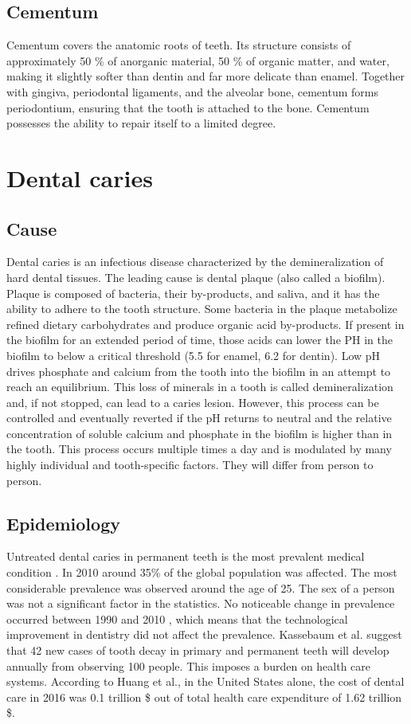 \subsection*{Cementum}
Cementum covers the anatomic roots of teeth. Its structure consists of approximately 50 \% of anorganic material, 50 \% of organic matter, and water, making it slightly softer than dentin and far more delicate than enamel. Together with gingiva, periodontal ligaments, and the alveolar bone, cementum forms periodontium, ensuring that the tooth is attached to the bone. Cementum possesses the ability to repair itself to a limited degree.

\section{Dental caries}

\subsection{Cause}
Dental caries is an infectious disease characterized by the demineralization of hard dental tissues. The leading cause is dental plaque (also called a biofilm). Plaque is composed of bacteria, their by-products, and saliva, and it has the ability to adhere to the tooth structure. Some bacteria in the plaque metabolize refined dietary carbohydrates and produce organic acid by-products. If present in the biofilm for an extended period of time, those acids can lower the PH in the biofilm to below a critical threshold (5.5 for enamel, 6.2 for dentin)\cite{2019a}. Low pH drives phosphate and calcium from the tooth into the biofilm in an attempt to reach an equilibrium. This loss of minerals in a tooth is called demineralization and, if not stopped, can lead to a caries lesion. However, this process can be controlled and eventually reverted if the pH returns to neutral and the relative concentration of soluble calcium and phosphate in the biofilm is higher than in the tooth. This process occurs multiple times a day and is modulated by many highly individual and tooth-specific factors. They will differ from person to person.

\subsection{Epidemiology}
Untreated dental caries in permanent teeth is the most prevalent medical condition \cite{Kassebaum2015}. In 2010 around 35\% of the global population was affected. The most considerable prevalence was observed around the age of 25. The sex of a person was not a significant factor in the statistics. No noticeable change in prevalence occurred between 1990 and 2010 \cite{Kassebaum2015} \cite{Frencken2017}, which means that the technological improvement in dentistry did not affect the prevalence.
Kassebaum et al. suggest that 42 new cases of tooth decay in primary and permanent teeth will develop annually from observing 100 people. This imposes a burden on health care systems. According to Huang et al., \cite{Hung2020} in the United States alone, the cost of dental care in 2016 was 0.1 trillion \$ out of total health care expenditure of 1.62 trillion \$.

